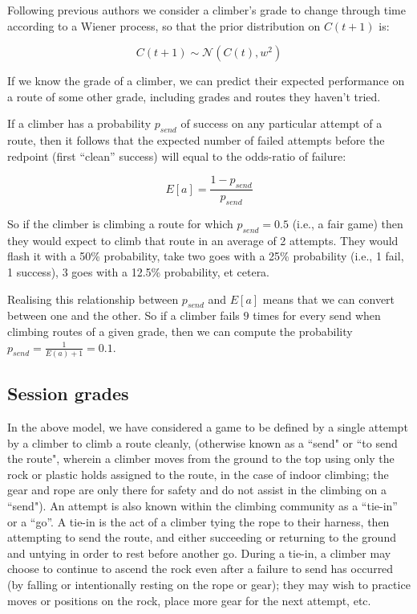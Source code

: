 \documentclass[12pt]{article}
\begin{document}
Following previous authors  \citep{coulom2008whole,scarff2020estimation} we consider a climber's grade to change through time according to a Wiener process, so that the prior distribution on $C(t+1)$ is:

\begin{equation}
C(t+1) \sim \mathcal{N}(C(t), w^2)
\end{equation}

If we know the grade of a climber, we can predict their expected performance on a route of some other grade, including grades and routes they haven't tried.

If a climber has a probability $p_{send}$ of success on any particular attempt of a route, then it follows that the expected number of failed attempts before the redpoint (first ``clean'' success) will equal to the odds-ratio of failure:

\begin{equation}
 E\left[a\right]=\frac{1-p_{send}}{p_{send}}
 \end{equation}

 So if the climber is climbing a route for which $p_{send}=0.5$ (i.e., a fair game) then they would expect to climb that route in an average of 2 attempts. They would flash it with a 50\% probability, take two goes with a 25\% probability (i.e., 1 fail, 1 success), 3 goes with a 12.5\% probability, et cetera.

Realising this relationship between $p_{send}$ and $ E\left[a\right]$ means that we can convert between one and the other. So if a climber fails $9$ times for every send when climbing routes of a given grade, then we can compute the probability  $p_{send} = \frac{1}{E(a)+1} = 0.1$.

\subsection{Session grades}

In the above model, we have considered a game to be defined by a single attempt by a climber to climb a route cleanly, (otherwise known as a ``send" or ``to send the route", wherein a climber moves from the ground to the top using only the rock or plastic holds assigned to the route, in the case of indoor climbing; the gear and rope are only there for safety and do not assist in the climbing on a ``send"). An attempt is also known within the climbing community as a ``tie-in'' or a ``go''. A tie-in is the act of a climber tying the rope to their harness, then attempting to send the route, and either succeeding or returning to the ground and untying in order to rest before another go.  During a tie-in, a climber may choose to continue to ascend the rock even after a failure to send has occurred (by falling or intentionally resting on the rope or gear); they may wish to practice moves or positions on the rock, place more gear for the next attempt, etc.
\end{document}
